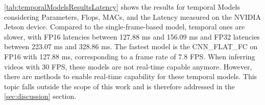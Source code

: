 \autoref{tab:temporalModelsResultsLatency} shows the results for temporal Models considering Parameters, Flops, MACs, and the Latency measured on the NVIDIA Jetson device.
Compared to the single-frame-based model, temporal ones are slower, with FP16 latencies between 127.88 ms and 156.09 ms and FP32 latencies between 223.07 ms and 328.86 ms.
The fastest model is the CNN\_FLAT\_FC on FP16 with 127.88 ms, corresponding to a frame rate of 7.8 \ac{FPS}.
When inferring videos with 30 \ac{FPS}, these models are not real-time capable anymore.
However, there are methods to enable real-time capability for these temporal models.
This topic falls outside the scope of this work and is therefore addressed in the \autoref{sec:discussion} section.
